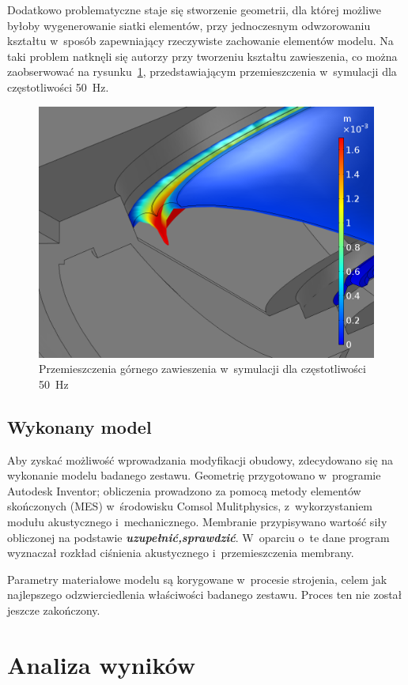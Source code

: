 \documentclass[12pt]{oska}
\newcommand{\comment}[1]{{\color{magenta}\emph{\textbf{#1}}}}
\begin{document}
		Dodatkowo problematyczne staje się stworzenie geometrii, dla której możliwe byłoby wygenerowanie siatki elementów, przy jednoczesnym odwzorowaniu kształtu w~sposób zapewniający rzeczywiste zachowanie elementów modelu. Na taki problem natknęli się autorzy przy tworzeniu kształtu zawieszenia, co można zaobserwować na rysunku~\ref{r:zawieszenie}, przedstawiającym przemieszczenia w~symulacji dla częstotliwości \SI{50}{\hertz}.
		
		\begin{figure}[!ht]
			\centering
			\includegraphics[width=.8\textwidth]{disp_factor5_f50_02.png}
			\caption{Przemieszczenia górnego zawieszenia w~symulacji dla częstotliwości \SI{50}{\hertz}}
			\label{r:zawieszenie}
		\end{figure}
		
	\subsection{Wykonany model}
	
		Aby zyskać możliwość wprowadzania modyfikacji obudowy, zdecydowano się na wykonanie modelu badanego zestawu. Geometrię przygotowano w~programie Autodesk Inventor; obliczenia prowadzono za pomocą metody elementów skończonych (MES) w~środowisku Comsol Mulitphysics, z~wykorzystaniem modułu akustycznego i~mechanicznego. Membranie przypisywano wartość siły obliczonej na podstawie \comment{uzupełnić,sprawdzić}. W~oparciu o~te dane program wyznaczał rozkład ciśnienia akustycznego i~przemieszczenia membrany.
		
		Parametry materiałowe modelu są korygowane w~procesie strojenia, celem jak najlepszego odzwierciedlenia właściwości badanego zestawu. Proces ten nie został jeszcze zakończony.
		

\section{Analiza wyników}
\end{document}
